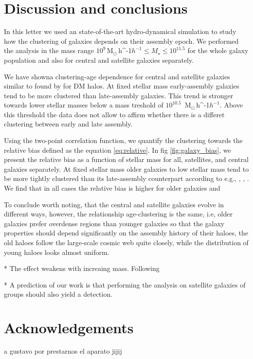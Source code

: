 \documentclass[fleqn,usenatbib]{mnras}
\newcommand{\Msunh}{\,{\rm M}$_{\odot}$\,\ifmmode h^{-1}\else $h^{-1}$\fi}
\begin{document}
\section{Discussion and conclusions}
\label{sec:conclu}

In this letter we used an state-of-the-art hydro-dynamical simulation
to study how the clustering of galaxies depends on their assembly
epoch.
We performed the analysis in the mass range $10^{9}$\Msunh $\leq
M_{\star} \leq 10^{11.5}$ for the whole galaxy population and also for 
central and satellite galaxies separately.

We have showna clustering-age  dependence for central and
satellite galaxies similar to found by \citet{2005MNRAS.363L..66G}
for DM halos. 
At fixed stellar mass early-assembly galaxies tend to be more
clustered than late-assembly galaxies.
This trend is stronger towards lower stellar masses below a mass
treshold of $10^{10.5}$
\Msunh. 
Above this threshold the data does not allow to affirm whether there
is a differet clustering between early and late assembly. 


Using the two-point correlation function, we quantify the clustering
towards the relative bias defined as the equation
\ref{eq:relative}. In fig \ref{fig:galaxy_bias}, we present the
relative bias as a function of stellar mass for all, satellites, and
central galaxies separately. At fixed stellar mass older galaxies to
low stellar mass tend to be more tightly clustered than its
late-assembly counterpart according to e.g., \citep{Lacerna_2014},
\citep{2013MNRAS.433..515W}, \citep{2009MNRAS.394.2229Z}. We find that
in all cases the relative bias is higher for older galaxies and 


To conclude worth noting, that the central and satellite galaxies
evolve in different ways, however, the relationship age-clustering is
the same, i.e, older galaxies prefer overdense regions than younger
galaxies so that the galaxy properties should depend significantly on
the assembly history of their haloes, the old haloes follow the
large-scale cosmic web quite closely, while the distribution of young
haloes looks almost uniform. 



* The effect weakens with increaing mass. Following 

* A prediction of our work is that performing the analysis on
satellite galaxies of groups should also yield a detection.

\section*{Acknowledgements}

a gustavo por prestarnos el aparato jijij






\bsp	%
\label{lastpage}
\end{document}
